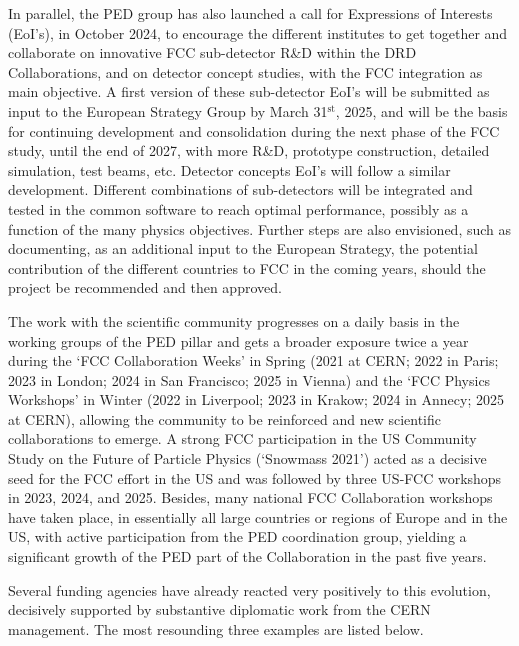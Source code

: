 In parallel, the PED group has also launched a call for Expressions of Interests (EoI's), in October 2024, to encourage the different institutes to get together and collaborate on innovative FCC sub-detector R\&D within the DRD Collaborations, and on detector concept studies, with the FCC integration as main objective. 
A first version of these sub-detector EoI's will be submitted as input to the European Strategy Group by March 31$^\text{st}$, 2025, and will be the basis for continuing development and consolidation during the next phase of the FCC study, until the end of 2027, with more R\&D, prototype construction, detailed simulation, test beams, etc. 
Detector concepts EoI’s will follow a similar development. 
Different combinations of sub-detectors will be integrated and tested in the common software to reach optimal performance, possibly as a function of the many physics objectives. 
Further steps are also envisioned, such as documenting, as an additional input to the European Strategy, the potential contribution of the different countries to FCC in the coming years, should the project be recommended and then approved.

The work with the scientific community progresses on a daily basis in the working groups of the PED pillar and gets a broader exposure twice a year during 
the `FCC Collaboration Weeks' in Spring (2021 at CERN; 2022 in Paris; 2023 in London; 2024 in San Francisco; 2025 in Vienna) 
and the `FCC Physics Workshops' in Winter (2022 in Liverpool; 2023 in Krakow; 2024 in Annecy; 2025 at CERN), 
allowing the community to be reinforced and new scientific collaborations to emerge. 
A strong FCC participation in the US Community Study on the Future of Particle Physics (`Snowmass 2021') acted as a decisive seed for the FCC effort in the US and was followed by three US-FCC workshops in 2023, 2024, and 2025. 
Besides, many national FCC Collaboration workshops have taken place, in essentially all large countries or regions of Europe and in the US, with active participation from the PED coordination group, yielding a significant growth of the PED part of the Collaboration in the past five years.

Several funding agencies have already reacted very positively to this evolution, decisively supported by substantive diplomatic work from the CERN management. 
The most resounding three examples are listed below.

